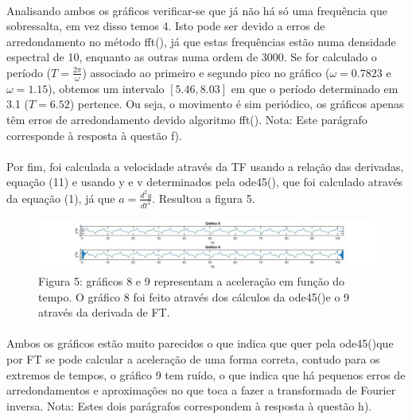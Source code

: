 \documentclass[a4paper, 11pt]{article}
\newcommand{\ode}{{\fontfamily{pcr}\selectfont ode45()}}
\newcommand{\fft}{{\fontfamily{pcr}\selectfont fft()}}
\begin{document}
	\paragraph{}
	Analisando ambos os gráficos verificar-se que já não há só uma frequência que sobressalta, em vez disso temos 4. Isto pode ser devido a erros de arredondamento no método \fft, já que estas frequências estão numa densidade espectral de 10, enquanto as outras numa ordem de 3000. Se for calculado o período ($T=\frac{2\pi}{\omega}$) associado ao primeiro e segundo pico no gráfico ($\omega=0.7823$ e $\omega=1.15$), obtemos um intervalo $[5.46, 8.03]$ em que o período determinado em 3.1 ($T=6.52$) pertence. Ou seja, o movimento é sim periódico, os gráficos apenas têm erros de arredondamento devido algoritmo \fft. 
	\newline
	{\footnotesize Nota: Este parágrafo corresponde à resposta à questão f).}
	\paragraph{}
	Por fim, foi calculada a velocidade através da TF usando a relação das derivadas, equação (11) e usando {\selectfont y} e {\selectfont v} determinados pela \ode, que foi calculado através da equação (1), já que $a=\frac{d^2y}{dt^2}$. Resultou a figura 5.
	\begin{figure}[h]
		\centering
		\captionsetup{labelformat=empty}
		\includegraphics[scale=0.4]{parteB_3}
		\caption{\scriptsize Figura 5: gráficos 8 e 9 representam a aceleração em função do tempo. O gráfico 8 foi feito através dos cálculos da \ode e o 9 através da derivada de FT.}
	\end{figure}
	\paragraph{}
	Ambos os gráficos estão muito parecidos o que indica que quer pela \ode que por FT se pode calcular a aceleração de uma forma correta, contudo para os extremos de tempos, o gráfico 9 tem ruído, o que indica que há pequenos erros de arredondamentos e aproximações no que toca a fazer a transformada de Fourier inversa. 
	\newline
	{\footnotesize Nota: Estes dois parágrafos correspondem à resposta à questão h).}
\end{document}
